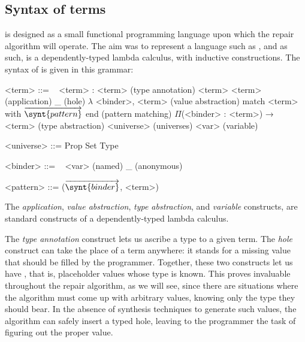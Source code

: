 \subsection{Syntax of terms}\label{chick-syntax-terms}

\Chick{} is designed as a small functional programming language upon which the
repair algorithm will operate.  The aim was to represent a language such as
\Gallina{}, and as such, \Chick{} is a dependently-typed lambda calculus, with
inductive constructions.  The syntax of \Chick{} is given in this grammar:

\begin{grammar}%
<term> ::= \ %
\alt <term> : <term>                                           \hfill (type annotation)
\alt <term> <term>                                             \hfill (application)
\alt _                                                         \hfill (hole)
\alt $\lambda$ <binder>, <term>                                \hfill (value abstraction)
\alt match <term> with $\overrightarrow{ \synt{pattern} }$ end \hfill (pattern matching)
\alt $\Pi$(<binder> : <term>) → <term>                         \hfill (type abstraction)
\alt <universe>                                                \hfill (universes)
\alt <var>                                                     \hfill (variable)

<universe> ::= Prop \alt Set \alt Type

<binder> ::= \ %
\alt <var> \hfill (named)
\alt _     \hfill (anonymous)

<pattern> ::= ($\overrightarrow{ \synt{binder} }$, <term>)
\end{grammar}

The \emph{application}, \emph{value abstraction}, \emph{type abstraction}, and
\emph{variable} constructs, are standard constructs of a dependently-typed
lambda calculus.

The \emph{type annotation} construct lets us ascribe a type to a given term.
The \emph{hole} construct can take the place of a term anywhere: it stands for a
missing value that should be filled by the programmer.  Together, these two
constructs let us have , that is, placeholder values whose
type is known.  This proves invaluable throughout the repair algorithm, as we
will see, since there are situations where the algorithm must come up with
arbitrary values, knowing only the type they should bear.  In the absence of
synthesis techniques to generate such values, the algorithm can safely insert a
typed hole, leaving to the programmer the task of figuring out the proper value.

